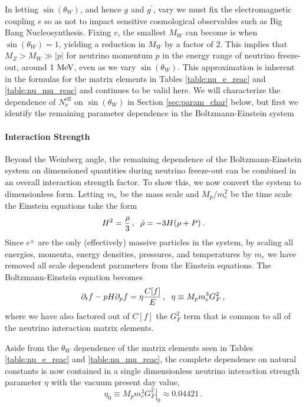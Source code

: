 In letting $\sin(\theta_W)$, and hence $g$ and $g^{'}$, vary we must fix the electromagnetic coupling $e$ so as not to impact sensitive cosmological observables such as Big Bang Nucleosynthesis.  Fixing $v$, the smallest $M_W$ can become is when $\sin(\theta_W)=1$, yielding a reduction in $M_W$ by a factor of $2$.  This implies that $M_Z>M_W\gg |p|$ for neutrino momentum $p$ in the energy range of neutrino freeze-out, around $1\text{ MeV}$, even as we vary $\sin(\theta_W)$.  This approximation is inherent in the formulas for the matrix elements  in Tables  \ref{table:nu_e_reac} and \ref{table:nu_mu_reac} and continues to be valid here. We will characterize the dependence of $N_\nu^{\mathrm{eff}}$ on $\sin(\theta_W)$ in Section \ref{sec:param_char} below, but first we identify the remaining parameter dependence in the Boltzmann-Einstein system


\paragraph{Interaction Strength} Beyond the Weinberg angle, the remaining  dependence of the Boltzmann-Einstein system on dimensioned quantities during  neutrino freeze-out  can be combined in an overall interaction strength factor.   To show this, we now convert the system  to dimensionless form. Letting $m_e$ be the mass scale and $M_p/m_e^2$ be the time scale the Einstein equations take the form
\begin{equation}
H^2=\frac{\rho}{3}\,,\hspace{2mm}\dot\rho=-3H(\rho+P)\,.
\end{equation}
 Since $e^\pm$ are the only (effectively) massive particles in the system, by scaling all energies, momenta, energy densities, pressures, and temperatures by $m_e$ we have removed all scale dependent parameters from the Einstein equations.  The Boltzmann-Einstein equation becomes
\begin{equation}\label{eta_def}
\partial_tf-pH\partial_pf=\eta\frac{C[f]}{E}\,,\hspace{2mm}\eta\equiv M_p m_e^3G_F^2\,,
\end{equation}
where we have also factored out of $C[f]$ the $G_F^2$ term that is common to all of the neutrino interaction matrix elements. 

Aside from the $\theta_W$ dependence of the matrix elements seen in Tables \ref{table:nu_e_reac} and \ref{table:nu_mu_reac}, the complete dependence on natural constants  is now contained in a single dimensionless neutrino interaction strength parameter $\eta$ with the vacuum present day value,
\begin{equation}\label{eta0_def}
\eta_0\equiv \left.M_p m_e^3 G_F^2\right|_0  \approx 0.04421\, .
\end{equation}




